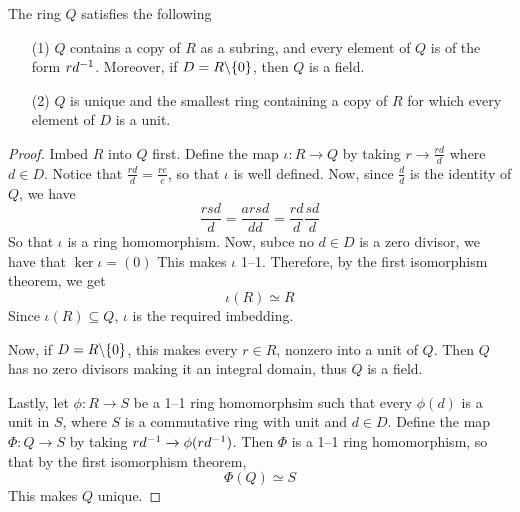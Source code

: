 \begin{corollary}
  The ring $Q$ satisfies the following
  \begin{enumerate}
    \item[(1)] $Q$ contains a copy of $R$ as a subring, and every element of
      $Q$ is of the form $rd^{-1}$. Moreover, if $D=R \backslash \{0\}$, then
      $Q$ is a field.

    \item[(2)] $Q$ is unique and the smallest ring containing a copy of  $R$
      for which every element of  $D$ is a unit.
  \end{enumerate}
\end{corollary}
\begin{proof}
  Imbed $R$ into $Q$ first. Define the map  $\iota:R \xrightarrow{} Q$ by
  taking $r \xrightarrow{} \frac{rd}{d}$ where $d \in D$. Notice that
  $\frac{rd}{d}=\frac{re}{e}$, so that $\iota$ is well defined. Now, since
  $\frac{d}{d}$ is the identity of $Q$, we have
  \begin{equation*}
    \frac{rsd}{d}=\frac{arsd}{dd}=\frac{rd}{d}\frac{sd}{d}
  \end{equation*}
  So that $\iota$ is a ring homomorphism. Now, subce no  $d \in D$ is a zero
  divisor, we have that $\ker{\iota}=(0)$ This makes  $\iota$ 1--1. Therefore,
  by the first isomorphism theorem, we get
  \begin{equation*}
    \iota(R) \simeq R
  \end{equation*}
  Since $\iota(R) \subseteq Q$, $\iota$ is the required imbedding.

  Now, if $D=R \backslash \{0\}$, this makes every $r \in R$, nonzero into a unit
  of  $Q$. Then $Q$ has no zero divisors making it an integral domain, thus
  $Q$ is a field.

  Lastly, let $\phi:R \xrightarrow{} S$ be a 1--1 ring homomorphsim such that
  every $\phi(d)$ is a unit in $S$, where $S$ is a commutative ring with unit
  and $d \in D$. Define the map  $\Phi:Q \xrightarrow{} S$ by taking $rd^{-1}
  \xrightarrow{} \phi(rd^{-1})$. Then $\Phi$ is a 1--1 ring homomorphism, so
  that by the first isomorphism theorem,
  \begin{equation*}
    \Phi(Q) \simeq S
  \end{equation*}
  This makes $Q$ unique.
\end{proof}


